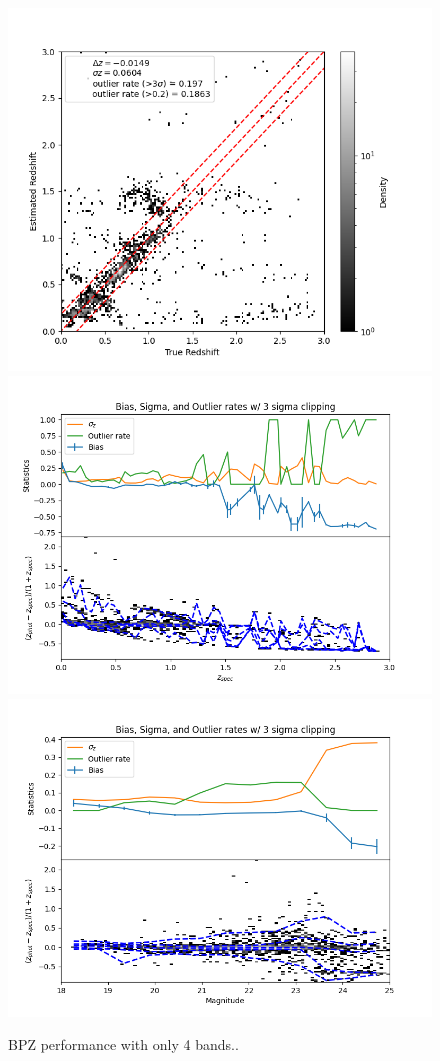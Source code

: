 \begin{figure}
    \centering
    \includegraphics[width=0.33\linewidth]{figures/zestimate_v_ztrue_hist2d_bpz_4.png}
    \includegraphics[width=0.33\linewidth]{figures/biweight_stats_v_redshift_bpz_4.png}
    \includegraphics[width=0.33\linewidth]{figures/biweight_stats_v_mag_bpz_4.png}
    \caption{BPZ performance with only 4 bands..}
    \label{fig:perf_bpz_4}
\end{figure}
